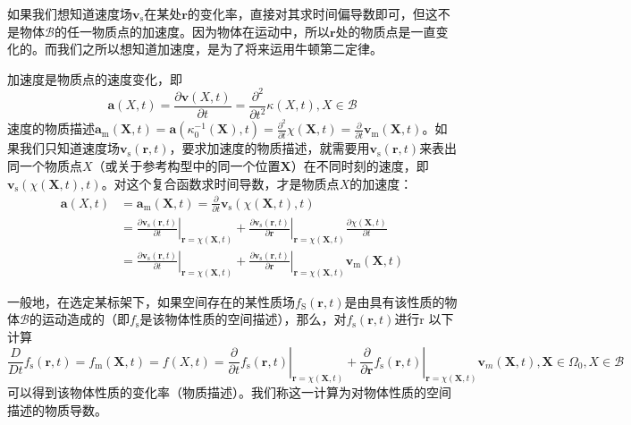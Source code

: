 \documentclass[main.tex]{subfiles}
\begin{document}
如果我们想知道速度场$\mathbf{v}_\mathrm{s}$在某处$\mathbf{r}$的变化率，直接对其求时间偏导数即可，但这不是物体$\mathcal{B}$的任一物质点的加速度。因为物体在运动中，所以$\mathbf{r}$处的物质点是一直变化的。而我们之所以想知道加速度，是为了将来运用牛顿第二定律。

加速度是物质点的速度变化，即
\[\mathbf{a}\left(X,t\right)=\frac{\partial\mathbf{v}\left(X,t\right)}{\partial t}=\frac{\partial^2}{\partial t^2}\kappa\left(X,t\right),X\in\mathcal{B}\]
速度的物质描述$\mathbf{a}_\mathrm{m}\left(\mathbf{X},t\right)=\mathbf{a}\left(\kappa_0^{-1}\left(\mathbf{X}\right),t\right)=\frac{\partial^2}{\partial t}\chi\left(\mathbf{X},t\right)=\frac{\partial}{\partial t}\mathbf{v}_\mathrm{m}\left(\mathbf{X},t\right)$。如果我们只知道速度场$\mathbf{v}_\mathrm{s}\left(\mathbf{r},t\right)$，要求加速度的物质描述，就需要用$\mathbf{v}_\mathrm{s}\left(\mathbf{r},t\right)$来表出同一个物质点$X$（或关于参考构型中的同一个位置$\mathbf{X}$）在不同时刻的速度，即$\mathbf{v}_\mathrm{s}\left(\chi\left(\mathbf{X},t\right),t\right)$。对这个复合函数求时间导数，才是物质点$X$的加速度：
\begin{align*}
\mathbf{a}\left(X,t\right)&=\mathbf{a}_\mathrm{m}\left(\mathbf{X},t\right)=\frac{\partial}{\partial t}\mathbf{v}_\mathrm{s}\left(\chi\left(\mathbf{X},t\right),t\right)\\
&=\left.\frac{\partial \mathbf{v}_\mathrm{s}\left(\mathbf{r},t\right)}{\partial t}\right|_{\mathbf{r}=\chi\left(\mathbf{X},t\right)}+\left.\frac{\partial\mathbf{v}_\mathrm{s}\left(\mathbf{r},t\right)}{\partial\mathbf{r}}\right|_{\mathbf{r}=\chi\left(\mathbf{X},t\right)}\frac{\partial\chi\left(\mathbf{X},t\right)}{\partial t}\\
&=\left.\frac{\partial \mathbf{v}_\mathrm{s}\left(\mathbf{r},t\right)}{\partial t}\right|_{\mathbf{r}=\chi\left(\mathbf{X},t\right)}+\left.\frac{\partial\mathbf{v}_\mathrm{s}\left(\mathbf{r},t\right)}{\partial\mathbf{r}}\right|_{\mathbf{r}=\chi\left(\mathbf{X},t\right)}\mathbf{v}_\mathrm{m}\left(\mathbf{X},t\right)
\end{align*}

一般地，在选定某标架下，如果空间存在的某性质场$f_\mathrm{S}\left(\mathbf{r},t\right)$是由具有该性质的物体$\mathcal{B}$的运动造成的（即$f_\mathrm{s}$是该物体性质的空间描述），那么，对$f_\mathrm{s}\left(\mathbf{r},t\right)$进行r 以下计算
\[
\frac{D}{Dt}f_\mathrm{s}\left(\mathbf{r},t\right)=f_\mathrm{m}\left(\mathbf{X},t\right)=f\left(X,t\right)=\left.\frac{\partial}{\partial t}f_\mathrm{s}\left(\mathbf{r},t\right)\right|_{\mathbf{r}=\chi\left(\mathbf{X},t\right)}+\left.\frac{\partial}{\partial \mathbf{r}}f_\mathrm{s}\left(\mathbf{r},t\right)\right|_{\mathbf{r}=\chi\left(\mathbf{X},t\right)}\mathbf{v}_m\left(\mathbf{X},t\right),\mathbf{X}\in\Omega_0,X\in\mathcal{B}\]
可以得到该物体性质的变化率（物质描述）。我们称这一计算为对物体性质的空间描述的物质导数。
\end{document}
